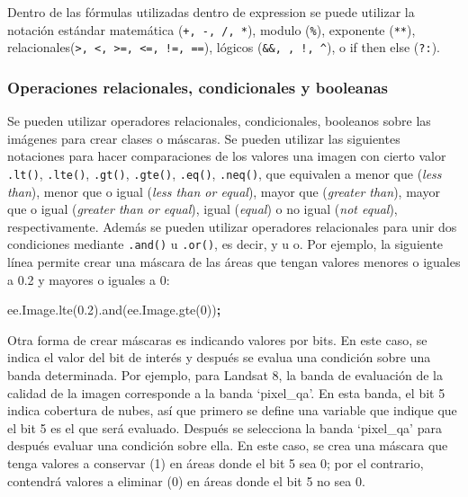 \documentclass[
]{article}
\newenvironment{Shaded}{\begin{snugshade}}{\end{snugshade}}
\newcommand{\AttributeTok}[1]{\textcolor[rgb]{0.77,0.63,0.00}{#1}}
\newcommand{\DecValTok}[1]{\textcolor[rgb]{0.00,0.00,0.81}{#1}}
\newcommand{\FloatTok}[1]{\textcolor[rgb]{0.00,0.00,0.81}{#1}}
\newcommand{\NormalTok}[1]{#1}
\newcommand{\OperatorTok}[1]{\textcolor[rgb]{0.81,0.36,0.00}{\textbf{#1}}}
\newcommand{\VariableTok}[1]{\textcolor[rgb]{0.00,0.00,0.00}{#1}}
\begin{document}
Dentro de las fórmulas utilizadas dentro de expression se puede utilizar
la notación estándar matemática (\texttt{+,\ -,\ /,\ *}), modulo
(\texttt{\%}), exponente (\texttt{**}),
relacionales(\texttt{\textgreater{},\ \textless{},\ \textgreater{}=,\ \textless{}=,\ !=,\ ==}),
lógicos (\texttt{\&\&,\ \textbar{}\textbar{},\ !,\ \^{}}), o if then
else (\texttt{?:}).

\hypertarget{operaciones-relacionales-condicionales-y-booleanas}{%
\subsubsection{Operaciones relacionales, condicionales y
booleanas}\label{operaciones-relacionales-condicionales-y-booleanas}}

Se pueden utilizar operadores relacionales, condicionales, booleanos
sobre las imágenes para crear clases o máscaras. Se pueden utilizar las
siguientes notaciones para hacer comparaciones de los valores una imagen
con cierto valor \texttt{.lt()}, \texttt{.lte()}, \texttt{.gt()},
\texttt{.gte()}, \texttt{.eq()}, \texttt{.neq()}, que equivalen a menor
que (\emph{less than}), menor que o igual (\emph{less than or equal}),
mayor que (\emph{greater than}), mayor que o igual (\emph{greater than
or equal}), igual (\emph{equal}) o no igual (\emph{not equal}),
respectivamente. Además se pueden utilizar operadores relacionales para
unir dos condiciones mediante \texttt{.and()} u \texttt{.or()}, es
decir, y u o. Por ejemplo, la siguiente línea permite crear una máscara
de las áreas que tengan valores menores o iguales a 0.2 y mayores o
iguales a 0:

\begin{Shaded}
\begin{Highlighting}[]
\VariableTok{ee}\NormalTok{.}\VariableTok{Image}\NormalTok{.}\AttributeTok{lte}\NormalTok{(}\FloatTok{0.2}\NormalTok{).}\AttributeTok{and}\NormalTok{(}\VariableTok{ee}\NormalTok{.}\VariableTok{Image}\NormalTok{.}\AttributeTok{gte}\NormalTok{(}\DecValTok{0}\NormalTok{))}\OperatorTok{;}
\end{Highlighting}
\end{Shaded}

Otra forma de crear máscaras es indicando valores por bits. En este
caso, se indica el valor del bit de interés y después se evalua una
condición sobre una banda determinada. Por ejemplo, para Landsat 8, la
banda de evaluación de la calidad de la imagen corresponde a la banda
`pixel\_qa'. En esta banda, el bit 5 indica cobertura de nubes, así que
primero se define una variable que indique que el bit 5 es el que será
evaluado. Después se selecciona la banda `pixel\_qa' para después
evaluar una condición sobre ella. En este caso, se crea una máscara que
tenga valores a conservar (1) en áreas donde el bit 5 sea 0; por el
contrario, contendrá valores a eliminar (0) en áreas donde el bit 5 no
sea 0.
\end{document}
